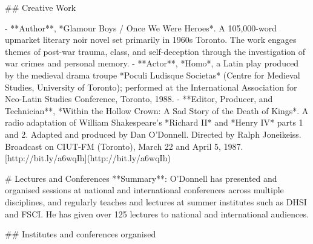 \sectionbreak{}
## Creative Work

- **Author**, *Glamour Boys /\allowbreak{} Once We Were Heroes*. A 105,000-word upmarket literary noir novel set primarily in 1960s Toronto. The work engages themes of post-war trauma, class, and self-deception through the investigation of war crimes and personal memory.
- **Actor**, *Homo*, a Latin play produced by the medieval drama troupe *Poculi Ludisque Societas* (Centre for Medieval Studies, University of Toronto); performed at the International Association for Neo-Latin Studies Conference, Toronto, 1988.
- **Editor, Producer, and Technician**, *Within the Hollow Crown: A Sad Story of the Death of Kings*. A radio adaptation of William Shakespeare’s *Richard II* and *Henry IV* parts 1 and 2. Adapted and produced by Dan O’Donnell. Directed by Ralph Joneikeiss. Broadcast on CIUT-FM (Toronto), March 22 and April 5, 1987. [http:/\allowbreak{}/\allowbreak{}bit.ly/\allowbreak{}a6wqIh](http:/\allowbreak{}/\allowbreak{}bit.ly/\allowbreak{}a6wqIh)

\sectionbreak{}
# Lectures and Conferences
**Summary**: O'Donnell has presented and organised sessions at national and international conferences across multiple disciplines, and regularly teaches and lectures at summer institutes such as DHSI and FSCI. He has given over 125 lectures to national and international audiences.

\sectionbreak{}
## Institutes and conferences organised

